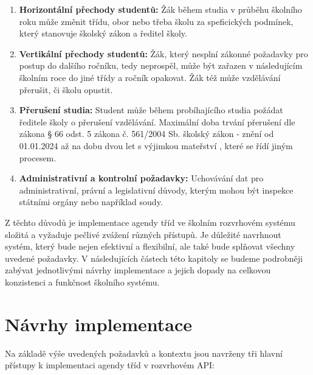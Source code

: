 \begin{enumerate}
    \item \textbf{Horizontální přechody studentů:} Žák během studia v průběhu školního roku může změnit třídu, obor nebo třeba školu za speficických podmínek, který stanovuje školský zákon a ředitel školy.
    \item \textbf{Vertikální přechody studentů:} Žák, který nesplní zákonné požadavky pro postup do dalšího ročníku, tedy neprospěl, může být zařazen v následujícím školním roce do jiné třídy a ročník opakovat. Žák též může vzdělávání přerušit, či školu opustit.
    \item \textbf{Přerušení studia:} Student může během probíhajícího studia požádat ředitele školy o přerušení vzdělávání. Maximální doba trvání přerušení dle zákona § 66 odst. 5 zákona č. 561/2004 Sb. školský zákon - znění od 01.01.2024 \cite{skolsky-zakon-preruseni-obyc} až na dobu dvou let s výjimkou mateřství \cite{skolsky-zakon-preruseni-materstvi}, které se řídí jiným procesem.
    \item \textbf{Administrativní a kontrolní požadavky:} Uchovávání dat pro administrativní, právní a legislativní důvody, kterým mohou být inspekce státními orgány nebo například soudy.
\end{enumerate}

Z těchto důvodů je implementace agendy tříd ve školním rozvrhovém systému složitá a vyžaduje pečlivé zvážení různých přístupů. Je důležité navrhnout systém, který bude nejen efektivní a flexibilní, ale také bude splňovat všechny uvedené požadavky. V následujících částech této kapitoly se budeme podrobněji zabývat jednotlivými návrhy implementace a jejich dopady na celkovou konzistenci a funkčnost školního systému.

\section{Návrhy implementace}
Na základě výše uvedených požadavků a kontextu jsou navrženy tři hlavní přístupy k implementaci agendy tříd v rozvrhovém API:

